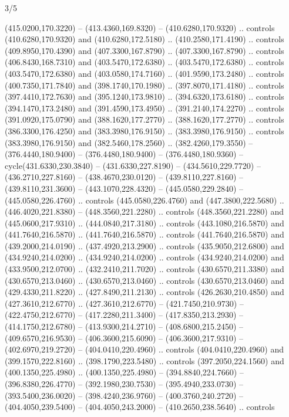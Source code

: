 \begin{flagdescription}{3/5}
\begin{scope}[shift={(0.5\flaglength,0.5\flagwidth)},scale=\flagwidth/510]
\begin{scope}[y=0.80pt, x=0.80pt, yscale=-1.06, xscale=1.06,yshift=-240pt,xshift=-400pt]
\begin{scope}[cm={{0.83333,0.0,0.0,0.83333,(154.64672,48.64761)}}]
\begin{scope}[cm={{0.93334,0.0,0.0,0.93334,(-4.86471,22.64035)}}]
\begin{scope}[line width=0.489\lw]
\begin{scope}[draw=c003300,fill=c338a00]
  (415.0200,170.3220) -- (413.4360,169.8320) -- (410.6280,170.9320) .. controls
  (410.6280,170.9320) and (410.6280,172.5180) .. (410.2580,171.4190) .. controls
  (409.8950,170.4390) and (407.3300,167.8790) .. (407.3300,167.8790) .. controls
  (406.8430,168.7310) and (403.5470,172.6380) .. (403.5470,172.6380) .. controls
  (403.5470,172.6380) and (403.0580,174.7160) .. (401.9590,173.2480) .. controls
  (400.7350,171.7840) and (398.1740,170.1980) .. (397.8070,171.4180) .. controls
  (397.4410,172.7630) and (395.1240,173.9810) .. (394.6320,173.6180) .. controls
  (394.1470,173.2480) and (391.4590,173.4950) .. (391.2140,174.2270) .. controls
  (391.0920,175.0790) and (388.1620,177.2770) .. (388.1620,177.2770) .. controls
  (386.3300,176.4250) and (383.3980,176.9150) .. (383.3980,176.9150) .. controls
  (383.3980,176.9150) and (382.5460,178.2560) .. (382.4260,179.3550) --
  (376.4440,180.9400) -- (376.4480,180.9400) -- (376.4480,180.9360) --
  cycle(431.6330,230.3840) -- (431.6330,227.8190) -- (434.5610,229.7720) --
  (436.2710,227.8160) -- (438.4670,230.0120) -- (439.8110,227.8160) --
  (439.8110,231.3600) -- (443.1070,228.4320) -- (445.0580,229.2840) --
  (445.0580,226.4760) .. controls (445.0580,226.4760) and (447.3800,222.5680) ..
  (446.4020,221.8380) -- (448.3560,221.2280) .. controls (448.3560,221.2280) and
  (445.0600,217.9310) .. (444.0840,217.3180) .. controls (443.1080,216.5870) and
  (441.7640,216.5870) .. (441.7640,216.5870) .. controls (441.7640,216.5870) and
  (439.2000,214.0190) .. (437.4920,213.2900) .. controls (435.9050,212.6800) and
  (434.9240,214.0200) .. (434.9240,214.0200) .. controls (434.9240,214.0200) and
  (433.9500,212.0700) .. (432.2410,211.7020) .. controls (430.6570,211.3380) and
  (430.6570,213.0460) .. (430.6570,213.0460) .. controls (430.6570,213.0460) and
  (429.4330,211.8220) .. (427.8490,211.2130) .. controls (426.2630,210.4850) and
  (427.3610,212.6770) .. (427.3610,212.6770) -- (421.7450,210.9730) --
  (422.4750,212.6770) -- (417.2280,211.3400) -- (417.8350,213.2930) --
  (414.1750,212.6780) -- (413.9300,214.2710) -- (408.6800,215.2450) --
  (409.6570,216.9530) -- (406.3600,215.6090) -- (406.3600,217.9310) --
  (402.6970,219.2720) -- (404.0410,220.4960) .. controls (404.0410,220.4960) and
  (399.1570,222.8160) .. (398.1790,223.5480) .. controls (397.2050,224.1560) and
  (400.1350,225.4980) .. (400.1350,225.4980) -- (394.8840,224.7660) --
  (396.8380,226.4770) -- (392.1980,230.7530) -- (395.4940,233.0730) --
  (393.5400,236.0020) -- (398.4240,236.9760) -- (400.3760,240.2720) --
  (404.4050,239.5400) -- (404.4050,243.2000) -- (410.2650,238.5640) .. controls

\end{scope}
\end{scope}
\end{scope}
\end{scope}
\end{scope}
\end{scope}
\end{flagdescription}

